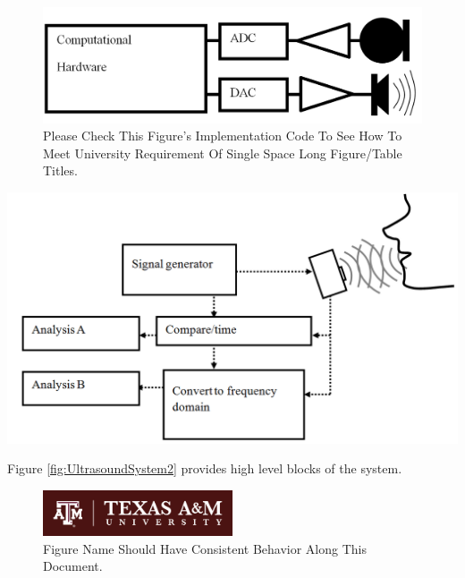 \begin{figure}[!hbp]
\begin{center}
\includegraphics[width=\textwidth]{graphic/UltraSoundSystem_Simple.PNG}
\caption[\protect\vspace{-2.8ex}{Please Check  This Figure's Implementation Code To See How To Meet University Requirement Of Single Space Long Figure/Table Titles.}]{Please Check  This Figure's Implementation Code To See How To Meet University Requirement Of Single Space Long Figure/Table Titles.}
\label{fig:UltrasoundSystem1}
\end{center}
\end{figure}
\begin{Contfigure}[!hbp]
\captionsetup{list=off}	%
\begin{center}
\includegraphics[width=\textwidth]{graphic/UltraSoundSystem_Flow.PNG}
\caption{}
\label{fig:UltrasoundSystem2}
\end{center}
\end{Contfigure}

Figure \ref{fig:UltrasoundSystem2} provides high level blocks of the system.

\begin{figure}[!hbp]
\begin{center}
\includegraphics[width=0.5\textwidth]{graphic/primaryWhiteMaroon_RGB.jpg}
\caption[\protect\vspace{-2.8ex}{Figure Name Should Have Consistent Behavior Along This Document.}]{Figure Name Should Have Consistent Behavior Along This Document.}
\label{fig:testExample2}
\end{center}
\end{figure}

